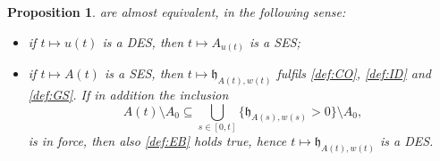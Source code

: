 \documentclass[a4paper,11pt,reqno]{amsart}
\numberwithin{equation}{section}
\newtheorem{prop}[teo]{Proposition}
\theoremstyle{definition}
\theoremstyle{remark}
\begin{document}
\begin{prop}\label{prop: almostEQ}
     are almost equivalent, in the following sense: 
    \begin{itemize}
        \item[(a)] if $t\mapsto u(t)$ is a DES, then $t\mapsto A_{u(t)}$ is a SES;
        \item[(b)] if $t\mapsto A(t)$ is a SES, then $t\mapsto \mathfrak{h}_{A(t),w(t)}$ fulfils \ref{def:CO}, \ref{def:ID} and \ref{def:GS}. If in addition the inclusion
        \begin{equation}\label{eq:hypinclusion}
            A(t)\setminus A_0\subseteq \bigcup_{s\in[0,t]}\{\mathfrak{h}_{A(s),w(s)}>0\}\setminus A_0,
        \end{equation}
        is in force, then also \ref{def:EB} holds true, hence $t\mapsto \mathfrak{h}_{A(t),w(t)}$ is a DES.
    \end{itemize}     
\end{prop}
\end{document}
